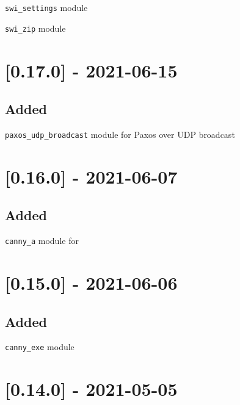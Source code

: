 \begin{shortlist}
    \item \verb$swi_settings$ module
    \item \verb$swi_zip$ module
\end{shortlist}

\section{[0.17.0] - 2021-06-15}

\subsection{Added}

\begin{shortlist}
    \item \verb$paxos_udp_broadcast$ module for Paxos over UDP broadcast
\end{shortlist}

\section{[0.16.0] - 2021-06-07}

\subsection{Added}

\begin{shortlist}
    \item \verb$canny_a$ module for 
\end{shortlist}

\section{[0.15.0] - 2021-06-06}

\subsection{Added}

\begin{shortlist}
    \item \verb$canny_exe$ module
\end{shortlist}

\section{[0.14.0] - 2021-05-05}

